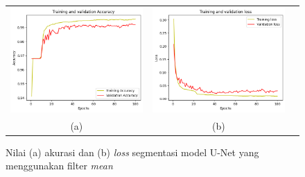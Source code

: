 \begin{enumerate}
	
	\begin{figure}[H]
		\centering
		\begin{tabular}{ccc}
			\includegraphics[scale=0.4]{bab4/acc-mean-unet.png} & 
			\includegraphics[scale=0.4]{bab4/loss-mean-unet.png} & \\
			(a) & (b)    %
		\end{tabular}
		\caption{Nilai (a) akurasi dan (b) \textit{loss} segmentasi model U-Net yang menggunakan filter \textit{mean}}
		\label{fig:performance-mean-unet}
	\end{figure}
	

\end{enumerate}
